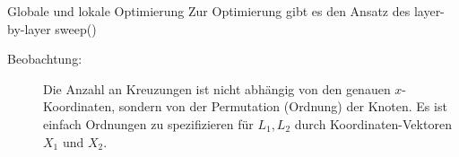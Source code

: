 \begin{TOP}{Globale und lokale Optimierung}
Zur Optimierung gibt es den Ansatz des \glqq layer-by-layer sweep\grqq (\algobreak{})
\begin{description}
	\item[Beobachtung:] Die Anzahl an Kreuzungen ist nicht abhängig von den genauen $x$-Koordinaten, sondern von der Permutation (Ordnung) der Knoten. Es ist einfach Ordnungen zu spezifizieren für $L_1,L_2$ durch Koordinaten-Vektoren $X_1$ und $X_2$.
\end{description}
\end{TOP}